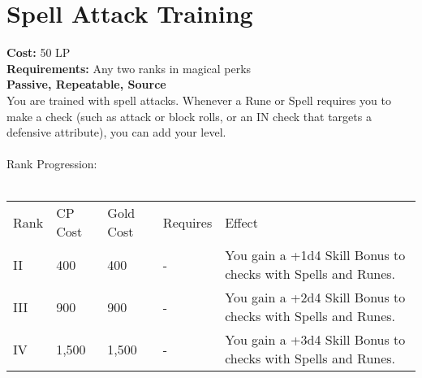 \section{Spell Attack Training}\label{perk:spellAttackTraining}
\textbf{Cost:} 50 LP\\
\textbf{Requirements:} Any two ranks in magical perks\\
\textbf{Passive, Repeatable, Source}\\
You are trained with spell attacks.
Whenever a Rune or Spell requires you to make a check (such as attack or block rolls, or an IN check that targets a defensive attribute), you can add your level.\\
\\
Rank Progression:\\
\\
\begin{longtable}{l | l | l | l | p{9cm}}
	Rank & CP Cost & Gold Cost & Requires & Effect\\
	II & 400 & 400 & - & You gain a +1d4 Skill Bonus to checks with Spells and Runes.\\
	III & 900 & 900 & - & You gain a +2d4 Skill Bonus to checks with Spells and Runes.\\
	IV & 1,500 & 1,500 & - & You gain a +3d4 Skill Bonus to checks with Spells and Runes.\\
\end{longtable}